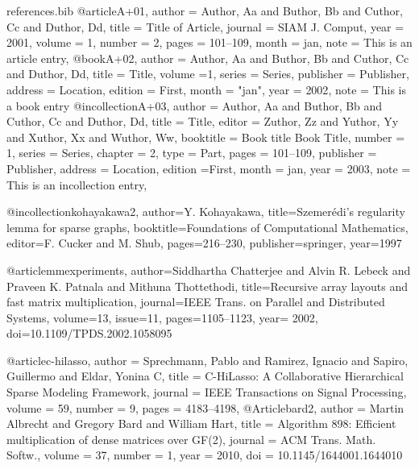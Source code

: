 \RequirePackage{filecontents}
\begin{filecontents}{references.bib}
@article{A+01,
  author = {Author, Aa and Buthor, Bb and Cuthor, Cc and Duthor, Dd},
  title = {Title of Article},
  journal = {SIAM J. Comput},
  year = {2001},
  volume = {1},
  number = {2},
  pages = {101--109},
  month = jan,
  note = {This is an article entry},
}
@book{A+02,
  author = {Author, Aa and Buthor, Bb and Cuthor, Cc and Duthor, Dd},
  title = {Title},
  volume ={1},
  series = {Series},
  publisher = {Publisher},
  address = {Location},
  edition = {First},
  month = "jan",
  year = {2002},
  note = {This is a book entry}
}
@incollection{A+03,
  author = {Author, Aa and Buthor, Bb and Cuthor, Cc and Duthor, Dd},
  title = {Title},
  editor = {Zuthor, Zz and Yuthor, Yy and Xuthor, Xx and Wuthor, Ww},
  booktitle = {Book title Book Title},
  number = {1},
  series = {Series},
  chapter = {2},
  type = {Part},
  pages = {101--109},
  publisher = {Publisher},
  address = {Location},
  edition ={First},
  month = jan,
  year = {2003},
  note = {This is an incollection entry},
}

@incollection{kohayakawa2,
author={Y. Kohayakawa},
title={{Szemer\'{e}di's} regularity lemma for sparse graphs},
booktitle={Foundations of Computational Mathematics},
editor={F. Cucker and M. Shub},
pages={216--230},
publisher=springer,
year={1997}
}

@article{mmexperiments,
author={Siddhartha Chatterjee and  Alvin R. Lebeck and  Praveen K. Patnala and Mithuna Thottethodi},
title={Recursive array layouts and fast matrix multiplication},
journal={IEEE Trans. on Parallel and Distributed Systems},
volume={13},
issue={11},
pages={1105--1123},
year= {2002},
doi={10.1109/TPDS.2002.1058095}
}

@article{c-hilasso,
    author = {Sprechmann, Pablo and Ramirez, Ignacio and Sapiro, Guillermo and Eldar, Yonina C},
    title = {{C-HiLasso}: A Collaborative Hierarchical Sparse Modeling Framework},
    journal = {IEEE Transactions on Signal Processing},
    volume = {59},
    number = {9},
    pages = {4183--4198},
}
@Article{bard2,
  author    = {Martin Albrecht and Gregory Bard and William Hart},
  title     = {Algorithm 898: {Efficient} multiplication of dense
          matrices over {GF(2)}},
  journal   = {ACM Trans. Math. Softw.},
  volume    = {37},
  number    = {1},
  year      = {2010},
  doi       = {10.1145/1644001.1644010}
}


\end{filecontents}
